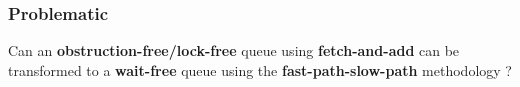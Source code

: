 \documentclass[10pt,a4paper]{beamer}
\begin{document}

\begin{frame}
  \frametitle{Problematic}
  \large Can an \textbf{obstruction-free/lock-free} queue using
  \textbf{fetch-and-add} can be transformed to a \textbf{wait-free} queue using
  the \textbf{fast-path-slow-path} methodology ?
\end{frame}
\end{document}
